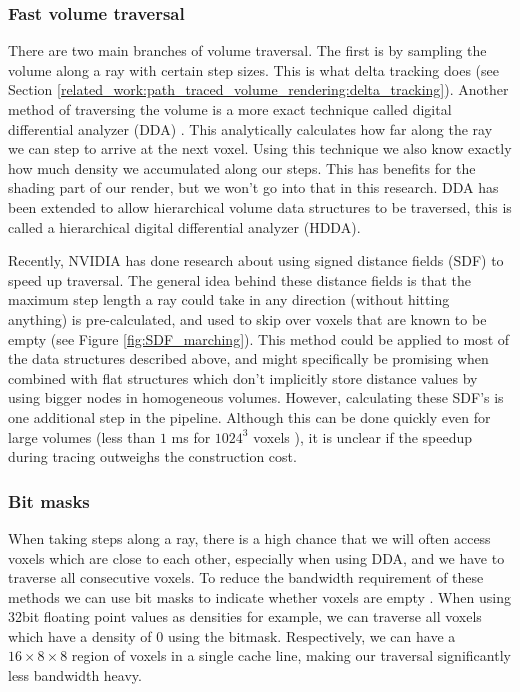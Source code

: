\subsubsection{Fast volume traversal} \label{related_work:attribute_separation:fast_volume_traversal}
There are two main branches of volume traversal. The first is by sampling the volume along a ray with certain step sizes. This is what delta tracking does (see Section \ref{related_work:path_traced_volume_rendering:delta_tracking}). Another method of traversing the volume is a more exact technique called digital differential analyzer (DDA) \cite{amanatides1987fast}. This analytically calculates how far along the ray we can step to arrive at the next voxel. Using this technique we also know exactly how much density we accumulated along our steps. This has benefits for the shading part of our render, but we won't go into that in this research. DDA has been extended to allow hierarchical volume data structures to be traversed, this is called a hierarchical digital differential analyzer (HDDA)\cite{laine2010efficient}.


Recently, NVIDIA has done research about using signed distance fields (SDF) to speed up traversal\cite{soderlund2022ray}. The general idea behind these distance fields is that the maximum step length a ray could take in any direction (without hitting anything) is pre-calculated, and used to skip over voxels that are known to be empty (see Figure \ref{fig:SDF_marching}). This method could be applied to most of the data structures described above, and might specifically be promising when combined with flat structures which don't implicitly store distance values by using bigger nodes in homogeneous volumes. However, calculating these SDF's is one additional step in the pipeline. Although this can be done quickly even for large volumes (less than $1$ ms for $1024^3$ voxels \cite{cao2010parallel}), it is unclear if the speedup during tracing outweighs the construction cost.
\subsubsection{Bit  masks} \label{related_work:attribute_separation:bitmasks}
When taking steps along a ray, there is a high chance that we will often access voxels which are close to each other, especially when using DDA, and we have to traverse all consecutive voxels. To reduce the bandwidth requirement of these methods we can use bit masks to indicate whether voxels are empty \cite{van2015real}\cite{museth2013vdb}. When using 32bit floating point values as densities for example, we can traverse all voxels which have a density of $0$ using the bitmask. Respectively, we can have a $16\times8\times8$ region of voxels in a single cache line, making our traversal significantly less bandwidth heavy.

